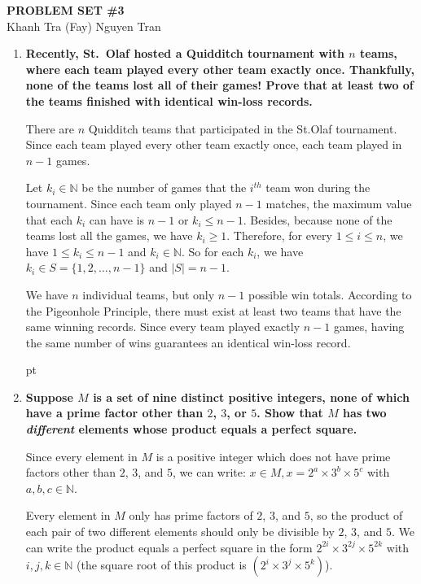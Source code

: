 \documentclass[10pt]{article}
\begin{document}
\begin{center}
\textbf{PROBLEM SET \#3}\\
Khanh Tra (Fay) Nguyen Tran
\end{center}

\begin{enumerate}

\item
\textbf{Recently, St.~Olaf hosted a Quidditch tournament with $n$ teams, where each team played every other team exactly once. Thankfully, none of the teams lost all of their games!  Prove that at least two of the teams finished with identical win-loss records.}

There are $n$ Quidditch teams that participated in the St.Olaf tournament. Since each team played every other team exactly once, each team played in $n-1$ games.

Let $k_i \in \mathbb{N}$ be the number of games that the $i^{th}$ team won during the tournament. Since each team only played $n-1$ matches, the maximum value that each $k_i$ can have is $n -1$ or $k_i \leq n-1$. Besides, because none of the teams lost all the games, we have $k_i \geq 1$. Therefore, for every $1 \leq i \leq n$, we have $1 \leq k_i \leq n - 1$ and $k_i \in \mathbb{N}$. So for each $k_i$, we have $k_i \in S=\{1,2,\ldots,n-1\}$ and $|S|=n-1$.

We have $n$ individual teams, but only $n-1$ possible win totals.  According to the Pigeonhole Principle, there must exist at least two teams that have the same winning records. Since every team played exactly $n-1$ games, having the same number of wins guarantees an identical win-loss record.

 pt

\item
\textbf{Suppose $M$ is a set of nine distinct positive integers, none of which have a prime factor other than $2$, $3$, or $5$.
Show that $M$ has two {\it different} elements whose product equals a perfect square.}

Since every element in $M$ is a positive integer which does not have prime factors other than $2$, $3$, and $5$, we can write: $x \in M, x = 2^a \times 3^b \times 5^c$ with $a, b, c \in \mathbb{N}$.

Every element in $M$ only has prime factors of $2$, $3$, and $5$, so the product of each pair of two different elements should only be divisible by $2$, $3$, and $5$. We can write the product equals a perfect square in the form $2^{2i}\times 3^{2j} \times 5^{2k}$ with $i,j,k \in \mathbb{N}$ (the square root of this product is $(2^i \times 3^j \times 5^k)$).


\end{enumerate}
\end{document}
